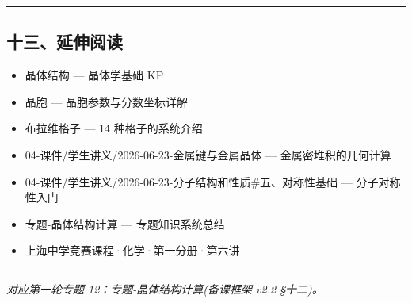 \begin{center}\rule{0.5\linewidth}{0.5pt}\end{center}

\subsection{十三、延伸阅读}\label{ux5341ux4e09ux5ef6ux4f38ux9605ux8bfb}

\begin{itemize}
\tightlist
\item
  晶体结构 --- 晶体学基础 KP
\item
  晶胞 --- 晶胞参数与分数坐标详解
\item
  布拉维格子 --- 14 种格子的系统介绍
\item
  04-课件/学生讲义/2026-06-23-金属键与金属晶体 --- 金属密堆积的几何计算
\item
  04-课件/学生讲义/2026-06-23-分子结构和性质\#五、对称性基础 --- 分子对称性入门
\item
  专题-晶体结构计算 --- 专题知识系统总结
\item
  上海中学竞赛课程·化学·第一分册·第六讲
\end{itemize}

\begin{center}\rule{0.5\linewidth}{0.5pt}\end{center}

\emph{对应第一轮专题 12：专题-晶体结构计算(备课框架 v2.2 §十二)。}
